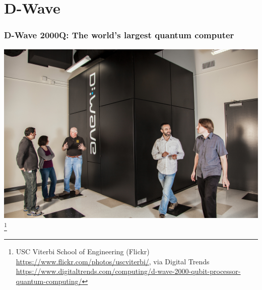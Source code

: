 \documentclass[notes]{beamer}
\begin{document}
\section{D-Wave}

\begin{frame}
\frametitle{D-Wave 2000Q: The world's largest quantum computer}

\begin{center}
\includegraphics[scale=0.16]{dwave}\footnote{USC Viterbi School of Engineering (Flickr) \url{https://www.flickr.com/photos/uscviterbi/}, via Digital Trends \url{https://www.digitaltrends.com/computing/d-wave-2000-qubit-processor-quantum-computing/}}
\end{center}
\end{frame}

\end{document}
